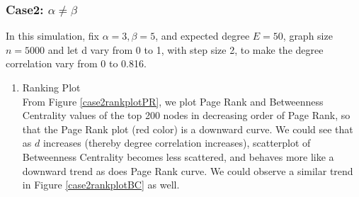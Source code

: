 \documentclass{article}
\begin{document}
\subsubsection{Case2: $\alpha \neq \beta$}
\par In this simulation, fix $\alpha=3, \beta=5$, and expected degree $E = 50$, graph size $ n=5000$ and let d vary from 0 to 1, with step size 2,  to make the degree correlation vary from 0 to 0.816.

\begin{enumerate}
\item Ranking Plot \\
From Figure \ref{case2rankplotPR}, we plot Page Rank and Betweenness Centrality values of the top 200 nodes in decreasing order of Page Rank, so that the Page Rank plot (red color) is a downward curve. We could see that as $d$ increases (thereby degree correlation increases), scatterplot of Betweenness Centrality  becomes less scattered, and behaves more like a downward trend as does Page Rank curve. We could observe a similar trend in Figure \ref{case2rankplotBC} as well.\\


\end{enumerate}
\end{document}
